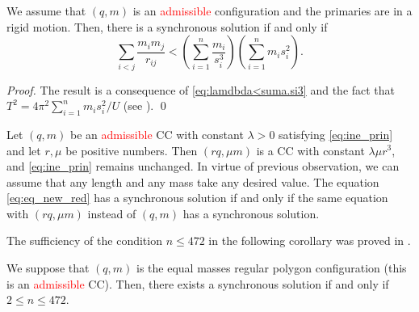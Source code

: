 \documentclass[smallcondensed]{svjour3}
\begin{document}
\begin{corollary}
We assume that $(q,m)$ is an \textcolor{red}{admissible}  configuration and  the primaries are in a rigid motion. Then, there is a synchronous solution if and only if
 \begin{equation}\label{eq:ine_prin}
 \sum_{i<j}\frac{m_im_j}{r_{ij}}<\left(\sum_{i=1}^n\frac{m_i}{s_i^3}\right)\left(\sum_{i=1}^nm_is_i^2\right).
\end{equation}
\end{corollary}

\begin{proof}
The result is a consequence of \eqref{eq:lamdbda<suma.si3} and the fact that $T^2=4\pi^2 \sum_{i=1}^{n}m_is_i^2/U$   (see \cite[p. 109]{JaumeLlibre276}).
\qed\end{proof}


\begin{remark}\label{com:sincronicas}

Let $(q,m)$  be an  \textcolor{red}{admissible}  CC  with constant $\lambda>0$ satisfying \eqref{eq:ine_prin} and let $r,\mu$ be positive numbers. Then  $(rq,\mu m)$ is a CC with constant $\lambda \mu r^3$, and \eqref{eq:ine_prin} remains unchanged. In virtue of previous observation, we can assume that any  length and any mass take any  desired value. The equation \eqref{eq:eq_new_red} has a synchronous solution if and only if the same equation with $(rq,\mu m)$ instead of $(q,m)$ has a synchronous solution.

\end{remark}





The sufficiency of the condition $n\leq 472$ in the following corollary  was proved in \cite{li2013characterization}.

\begin{corollary}\label{cor:nleq472}
We suppose that $(q,m)$ is the equal masses regular polygon configuration  (this is an \textcolor{red}{admissible} CC). Then, there exists a synchronous solution if and only if $2\leq n\leq 472$.
\end{corollary}
\end{document}
